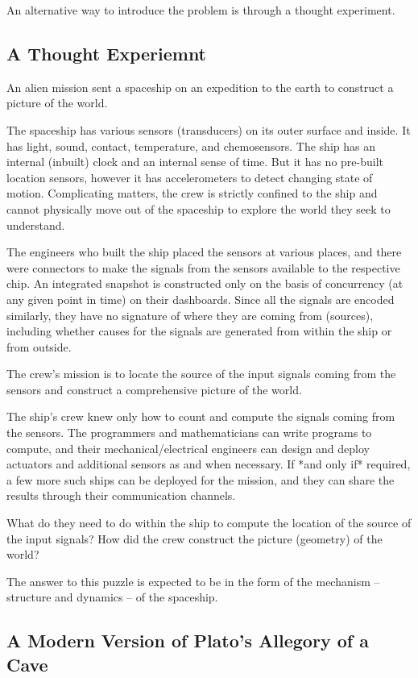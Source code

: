 An alternative way to introduce the problem is through a thought experiment. 

\subsection{A Thought Experiemnt}

An alien mission sent a spaceship on an expedition to the earth to construct a picture of the world.

The spaceship has various sensors (transducers) on its outer surface and inside. It has light, sound, contact, temperature, and chemosensors. The ship has an internal (inbuilt) clock and an internal sense of time. But it has no pre-built location sensors, however it has accelerometers to detect changing state of motion.  Complicating matters, the crew is strictly confined to the ship and cannot physically move out of the spaceship to explore the world they seek to understand.

The engineers who built the ship placed the sensors at various places, and there were connectors to make the signals from the sensors available to the respective chip. An integrated snapshot is constructed only on the basis of concurrency (at any given point in time) on their dashboards. Since all the signals are encoded similarly, they have no signature of where they are coming from (sources), including whether causes for the signals are generated from within the ship or from outside. 

The crew's mission is to locate the source of the input signals coming from the sensors and construct a comprehensive picture of the world.

The ship's crew knew only how to count and compute the signals coming from the sensors. The programmers and mathematicians can write programs to compute, and their mechanical/electrical engineers can design and deploy actuators and additional sensors as and when necessary. If *and only if* required, a few more such ships can be deployed for the mission, and they can share the results through their communication channels.

What do they need to do within the ship to compute the location of the source of the input signals? How did the crew construct the picture (geometry) of the world?

The answer to this puzzle is expected to be in the form of the mechanism --  structure and dynamics -- of the spaceship.

\subsection{A Modern Version of Plato's Allegory of a Cave}

